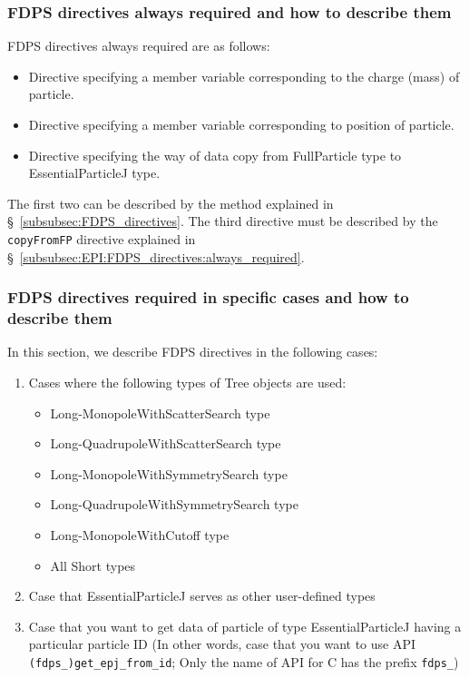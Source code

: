 \subsubsection{FDPS directives always required and how to describe them}
FDPS directives always required are as follows:
\begin{itemize}[leftmargin=*,itemsep=-1ex]
\item Directive specifying a member variable corresponding to the charge (mass) of particle.
\item Directive specifying a member variable corresponding to position of particle.
\item Directive specifying the way of data copy from FullParticle type to EssentialParticleJ type.
\end{itemize}
The first two can be described by the method explained in \S~\ref{subsubsec:FDPS_directives}. The third directive must be described by the \texttt{copyFromFP} directive explained in \S~\ref{subsubsec:EPI:FDPS_directives:always_required}.

\subsubsection{FDPS directives required in specific cases and how to describe them}
\label{sec:EPJ:FDPS_directives_required_in_specific_cases}
In this section, we describe FDPS directives in the following cases:
\begin{enumerate}[leftmargin=*,itemsep=-1ex,label=(\roman*)]
\item Cases where the following types of Tree objects are used:
\begin{itemize}
\item Long-MonopoleWithScatterSearch type
\item Long-QuadrupoleWithScatterSearch type
\item Long-MonopoleWithSymmetrySearch type
\item Long-QuadrupoleWithSymmetrySearch type
\item Long-MonopoleWithCutoff type
\item All Short types
\end{itemize}
\item Case that EssentialParticleJ serves as other user-defined types
\item Case that you want to get data of particle of type EssentialParticleJ having a particular particle ID (In other words, case that you want to use API \texttt{(fdps\_)get\_epj\_from\_id}; Only the name of API for C has the prefix \texttt{fdps\_})
\end{enumerate}

